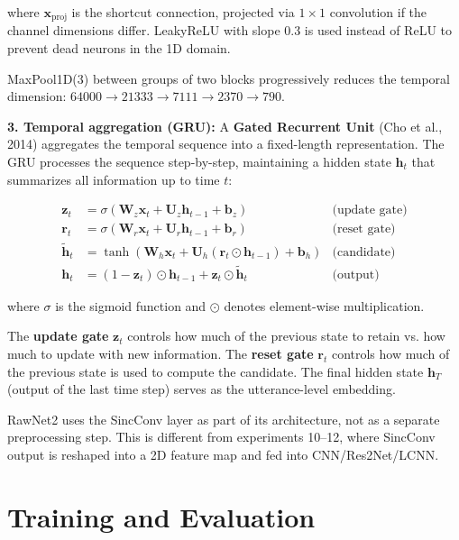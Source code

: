 \documentclass[12pt]{report}
\begin{document}
where $\bm{x}_\text{proj}$ is the shortcut connection, projected via $1 \times 1$ convolution
if the channel dimensions differ. LeakyReLU with slope 0.3 is used instead of ReLU to prevent
dead neurons in the 1D domain.

MaxPool1D(3) between groups of two blocks progressively reduces the temporal dimension:
$64000 \to 21333 \to 7111 \to 2370 \to 790$.

\textbf{3. Temporal aggregation (GRU):}
A \textbf{Gated Recurrent Unit} (Cho et al., 2014) aggregates the temporal sequence into a
fixed-length representation. The GRU processes the sequence step-by-step, maintaining a hidden
state $\bm{h}_t$ that summarizes all information up to time $t$:

\begin{align}
    \bm{z}_t &= \sigma(\bm{W}_z \bm{x}_t + \bm{U}_z \bm{h}_{t-1} + \bm{b}_z) & \text{(update gate)} \\
    \bm{r}_t &= \sigma(\bm{W}_r \bm{x}_t + \bm{U}_r \bm{h}_{t-1} + \bm{b}_r) & \text{(reset gate)} \\
    \tilde{\bm{h}}_t &= \tanh(\bm{W}_h \bm{x}_t + \bm{U}_h (\bm{r}_t \odot \bm{h}_{t-1}) + \bm{b}_h) & \text{(candidate)} \\
    \bm{h}_t &= (1 - \bm{z}_t) \odot \bm{h}_{t-1} + \bm{z}_t \odot \tilde{\bm{h}}_t & \text{(output)}
\end{align}

where $\sigma$ is the sigmoid function and $\odot$ denotes element-wise multiplication.

The \textbf{update gate} $\bm{z}_t$ controls how much of the previous state to retain vs.
how much to update with new information. The \textbf{reset gate} $\bm{r}_t$ controls how much
of the previous state is used to compute the candidate. The final hidden state $\bm{h}_T$
(output of the last time step) serves as the utterance-level embedding.

\begin{notebox}
    RawNet2 uses the SincConv layer as part of its architecture, not as a separate preprocessing
    step. This is different from experiments 10--12, where SincConv output is reshaped into a
    2D feature map and fed into CNN/Res2Net/LCNN.
\end{notebox}


\chapter{Training and Evaluation}
\end{document}

